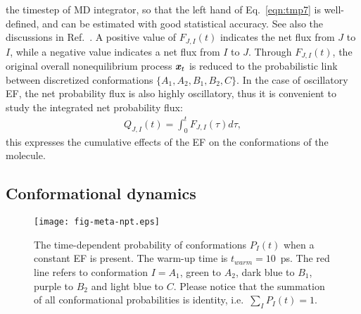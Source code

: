 \documentclass[a4paper,preprint,unsortedaddress,onecolumn]{revtex4-1}
\newcommand{\recheck}[1]{{\color{red} #1}}
\newcommand{\redc}[1]{{\color{red} #1}}
\newcommand{\vect}[1]{\textbf{\textit{#1}}}
\begin{document}
the timestep of MD integrator, 
so that the left hand of Eq.~\eqref{eqn:tmp7} is well-defined, and can be
estimated with good statistical accuracy.
See also the discussions in Ref.~\cite{schuette2011markov}.
A positive value \recheck{of $F_{J,I}(t)$} indicates the
net flux from $J$ to $I$,
while a negative value indicates a net flux from $I$ to $J$.
Through $F_{J,I}(t)$, the original overall nonequilibrium process $\vect x_t$
is reduced to the probabilistic link between discretized conformations $\{A_1, A_2, B_1, B_2, C\}$.
In the case of oscillatory EF, the net probability flux is also highly oscillatory,
thus it is convenient to study the integrated net probability flux:
\begin{align}\label{eqn:tmp7a}
  Q_{J,I} (t) = \int_0^t F_{J,I}(\tau)d \tau,
\end{align}
\redc{this expresses the cumulative effects of the EF
on the conformations of the molecule.}





\subsection{Conformational dynamics}


\begin{figure}
  \centering
  \texttt{[image: fig-meta-npt.eps]}
  \caption{\recheck{The time-dependent probability of conformations $P_I(t)$} 
    when a constant EF is present.
    The warm-up time is $t_{warm} = 10$~ps. The red line refers to conformation $I = A_1$,
    green to $A_2$, dark blue to $B_1$, purple to $B_2$ and light blue
    to $C$. \recheck{Please notice that the summation of all conformational
      probabilities
    is identity, i.e.~$\sum_I P_I(t) = 1$.}
  }
  \label{fig:tmp5}
\end{figure}
\end{document}

